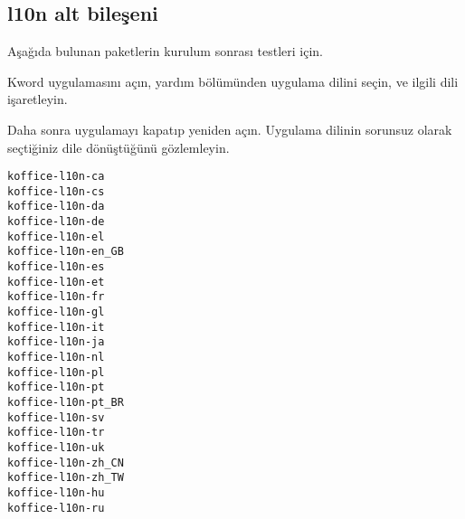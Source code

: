 \documentclass[a4paper,10pt]{article}
\begin{document}
\subsection*{l10n alt bileşeni}
Aşağıda bulunan paketlerin kurulum sonrası testleri için. 

Kword uygulamasını açın, yardım bölümünden uygulama dilini seçin, ve ilgili dili işaretleyin. 

Daha sonra uygulamayı kapatıp yeniden açın. Uygulama dilinin sorunsuz olarak seçtiğiniz dile dönüştüğünü gözlemleyin.

\begin{verbatim}
koffice-l10n-ca
koffice-l10n-cs
koffice-l10n-da
koffice-l10n-de
koffice-l10n-el
koffice-l10n-en_GB
koffice-l10n-es
koffice-l10n-et
koffice-l10n-fr
koffice-l10n-gl
koffice-l10n-it
koffice-l10n-ja
koffice-l10n-nl
koffice-l10n-pl
koffice-l10n-pt
koffice-l10n-pt_BR
koffice-l10n-sv
koffice-l10n-tr
koffice-l10n-uk
koffice-l10n-zh_CN
koffice-l10n-zh_TW
koffice-l10n-hu
koffice-l10n-ru
\end{verbatim}
\end{document}
